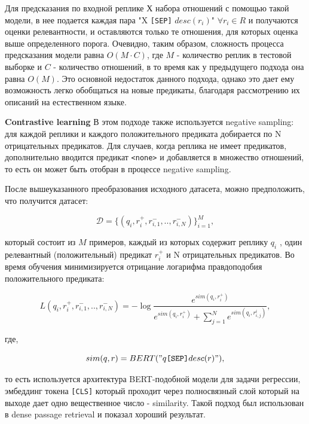 Для предсказания по входной реплике Х набора отношений с помощью такой модели, в нее подается каждая пара "X \texttt{[SEP]} $desc(r_i)$" $\forall r_i \in R$ и получаются оценки релевантности, и оставляются только те отношения, для которых оценка выше определенного порога. Очевидно, таким образом, сложность процесса предсказания модели равна $O(M \cdotp C)$, где $M$ - количество реплик в тестовой выборке и $C$ - количество отношений, в то время как у предыдущего подхода она равна $O(M)$. Это основной недостаток данного подхода, однако это дает ему возможность легко обобщаться на новые предикаты, благодаря рассмотрению их описаний на естественном языке.

\textbf{Contrastive learning}   В этом подходе также используется negative sampling: для каждой реплики и каждого положительного предиката добирается по N отрицательных предикатов. Для случаев, когда реплика не имеет предикатов, дополнительно вводится предикат \texttt{<none>} и добавляется в множество отношений, то есть он может быть отобран в
процессе negative sampling.

После вышеуказанного преобразования исходного датасета, можно предположить, что получится датасет:

\begin{equation}\label{nll_dataset}
    \mathcal{D} = \{(q_i, r^{+}_{i}, r^{-}_{i, 1},..,r^{-}_{i, N})\}_{i=1}^{M},
\end{equation}

который состоит из $M$ примеров, каждый из которых содержит реплику $q_i$ , один релевантный (положительный) предикат $r^{+}_i$ и N отрицательных предикатов. Во время обучения минимизируется отрицание логарифма правдоподобия положительного предиката:

\begin{equation}\label{contrastive_loss}
    L(q_i, r^{+}_{i}, r^{-}_{i, 1},..,r^{-}_{i, N}) =
    -\log{\frac{e^{sim(q_i, r^{+}_i)}}{e^{sim(q_i, r^{+}_i)} + \sum^{N}_{j=1}{e^{sim(q_i, r^{i}_{i, j})}}}},
\end{equation}

где,

\begin{equation}\label{similarity_func}
    sim(q, r) = BERT("q \texttt{[SEP]} desc(r)"),
\end{equation}

то есть используется архитектура BERT-подобной модели для задачи регрессии, эмбеддинг токена \texttt{[CLS]} который проходит через полносвязный слой который на выходе дает одно вещественное число - similarity. Такой подход был использован в dense passage retrieval \cite{dpr} и показал хороший результат.

